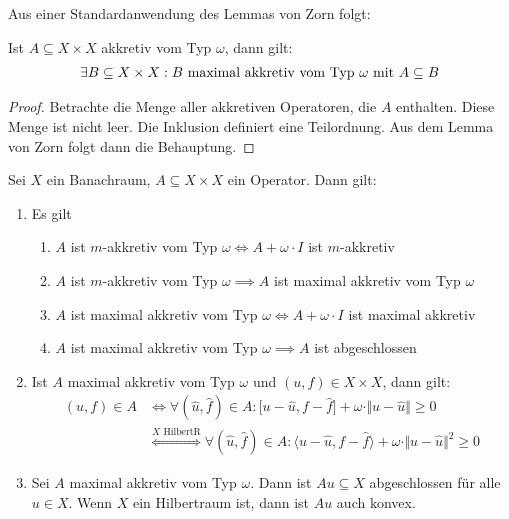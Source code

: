 Aus einer Standardanwendung des Lemmas von Zorn folgt:

\begin{lemma}
Ist $A\subseteq X\times X$ akkretiv vom Typ $\omega$, dann gilt:
\begin{align*}
\exists B\subseteq X\times X: B\text{ maximal akkretiv vom Typ }\omega\mit A\subseteq B
\end{align*}
\end{lemma}
\begin{proof}
Betrachte die Menge aller akkretiven Operatoren, die $A$ enthalten. Diese Menge ist nicht leer. Die Inklusion definiert eine Teilordnung. Aus dem Lemma von Zorn folgt dann die Behauptung.
\end{proof}

\begin{lemma}
Sei $X$ ein Banachraum, $A\subseteq X\times X$ ein Operator. Dann gilt:
\begin{enumerate}[label=(\alph*)]
\item Es gilt %
\begin{enumerate}[label=(\roman*)]
\item $A$ ist $m$-akkretiv vom Typ $\omega\Longleftrightarrow A+\omega\cdot I$ ist $m$-akkretiv
\item $A$ ist $m$-akkretiv vom Typ $\omega\implies A$ ist maximal akkretiv vom Typ $\omega$
\item $A$ ist maximal akkretiv vom Typ $\omega\Longleftrightarrow A+\omega\cdot I$ ist maximal akkretiv
\item $A$ ist maximal akkretiv vom Typ $\omega\implies A$ ist abgeschlossen
 \end{enumerate}
 \item Ist $A$ maximal akkretiv vom Typ $\omega$ und $(u,f)\in X\times X$, dann gilt:
 \begin{align*}
 (u,f)\in A&\Longleftrightarrow\forall(\hat{u},\hat{f})\in A:\big[u-\hat{u},f-\hat{f}\big]+\omega\cdot\Vert u-\hat{u}\Vert\geq0\\
 &\stackrel{X\text{ HilbertR}}{\Longleftrightarrow}
 \forall(\hat{u},\hat{f})\in A:\big\langle u-\hat{u},f-\hat{f}\big\rangle+\omega\cdot\Vert u-\hat{u}\Vert^2\geq0
 \end{align*}
 \item Sei $A$ maximal akkretiv vom Typ $\omega$. Dann ist $Au\subseteq X$ abgeschlossen für alle $u\in X$. Wenn $X$ ein Hilbertraum ist, dann ist $Au$ auch konvex.
\end{enumerate}
\end{lemma}
